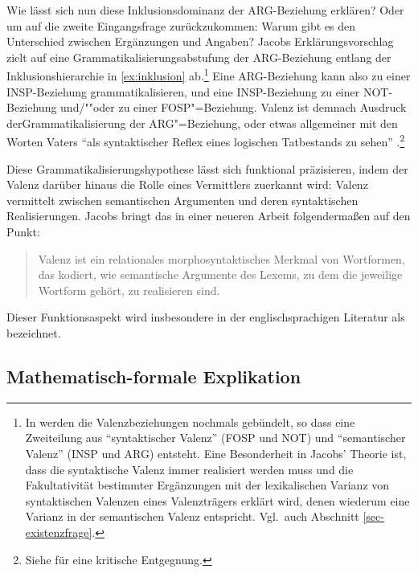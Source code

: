 Wie lässt sich nun diese Inklusionsdominanz der ARG-Beziehung erklären? Oder um auf die zweite Eingangsfrage zurückzukommen: Warum gibt es den Unterschied zwischen Ergänzungen und Angaben? Jacobs Erklärungsvorschlag zielt auf eine Grammatikalisierungsabstufung der ARG-Beziehung entlang der Inklusionshierarchie in \ref{ex:inklusion} ab.\footnote{In \cite{Jacobs:94a} werden die Valenzbeziehungen nochmals gebündelt, so dass eine Zweiteilung aus  "`syntaktischer Valenz"' (FOSP und NOT) und "`semantischer Valenz"' (INSP und ARG) entsteht. Eine Besonderheit in Jacobs' Theorie ist, dass die syntaktische Valenz immer realisiert werden muss und die Fakultativität bestimmter Ergänzungen mit der lexikalischen Varianz von syntaktischen Valenzen eines Valenzträgers erklärt wird, denen wiederum eine Varianz in der semantischen Valenz entspricht. Vgl.\ auch Abschnitt \ref{sec-existenzfrage}.}   
Eine ARG-Beziehung kann also zu einer INSP-Beziehung grammatikalisieren, und eine INSP-Bezie\-hung zu einer NOT-Bezie\-hung und/""oder zu einer FOSP"=Be\-ziehung. Valenz ist demnach Ausdruck der\linebreak Grammatikalisierung der ARG"=Bezie\-hung, oder etwas allgemeiner mit den Worten Vaters "`als syntaktischer Reflex eines logischen Tatbestands zu sehen"' \citep[225]{Vater:81}.\footnote{Siehe \citet[205ff]{Agel:00} für eine kritische Entgegnung.}
  
Diese Grammatikalisierungshypothese lässt sich funktional präzisieren, indem der Valenz darüber hinaus die Rolle eines Vermittlers zuerkannt wird: Valenz vermittelt zwischen semantischen Argumenten und deren syntaktischen Realisierungen. Jacobs bringt das in einer neueren Arbeit folgenderma\ss en auf den Punkt: 

\begin{quote}
Valenz ist ein relationales morphosyntaktisches Merkmal von Wortformen, das kodiert, wie semantische Argumente des Lexems, zu dem die jeweilige Wortform gehört, zu realisieren sind. \citep[504]{Jacobs:09}
\end{quote}
Dieser Funktionsaspekt wird insbesondere in der englischsprachigen Literatur als  bezeichnet.



\subsection{Mathematisch-formale Explikation}

